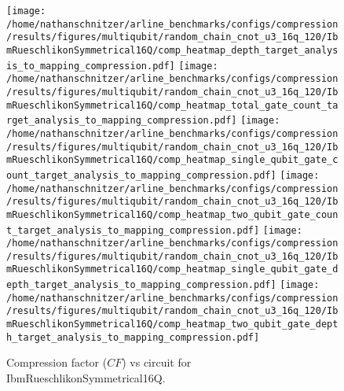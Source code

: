 \documentclass{report}%
\begin{document}
\begin{figure}[h!]%
\centering%
\texttt{[image: /home/nathanschnitzer/arline\_benchmarks/configs/compression/results/figures/multiqubit/random\_chain\_cnot\_u3\_16q\_120/IbmRueschlikonSymmetrical16Q/comp\_heatmap\_depth\_target\_analysis\_to\_mapping\_compression.pdf]}%
\centering%
\texttt{[image: /home/nathanschnitzer/arline\_benchmarks/configs/compression/results/figures/multiqubit/random\_chain\_cnot\_u3\_16q\_120/IbmRueschlikonSymmetrical16Q/comp\_heatmap\_total\_gate\_count\_target\_analysis\_to\_mapping\_compression.pdf]}%
\linebreak%
\centering%
\texttt{[image: /home/nathanschnitzer/arline\_benchmarks/configs/compression/results/figures/multiqubit/random\_chain\_cnot\_u3\_16q\_120/IbmRueschlikonSymmetrical16Q/comp\_heatmap\_single\_qubit\_gate\_count\_target\_analysis\_to\_mapping\_compression.pdf]}%
\centering%
\texttt{[image: /home/nathanschnitzer/arline\_benchmarks/configs/compression/results/figures/multiqubit/random\_chain\_cnot\_u3\_16q\_120/IbmRueschlikonSymmetrical16Q/comp\_heatmap\_two\_qubit\_gate\_count\_target\_analysis\_to\_mapping\_compression.pdf]}%
\linebreak%
\centering%
\texttt{[image: /home/nathanschnitzer/arline\_benchmarks/configs/compression/results/figures/multiqubit/random\_chain\_cnot\_u3\_16q\_120/IbmRueschlikonSymmetrical16Q/comp\_heatmap\_single\_qubit\_gate\_depth\_target\_analysis\_to\_mapping\_compression.pdf]}%
\centering%
\texttt{[image: /home/nathanschnitzer/arline\_benchmarks/configs/compression/results/figures/multiqubit/random\_chain\_cnot\_u3\_16q\_120/IbmRueschlikonSymmetrical16Q/comp\_heatmap\_two\_qubit\_gate\_depth\_target\_analysis\_to\_mapping\_compression.pdf]}%
\linebreak%
\caption{Compression factor ($CF$) vs circuit for IbmRueschlikonSymmetrical16Q.}%
\end{figure}
\end{document}
